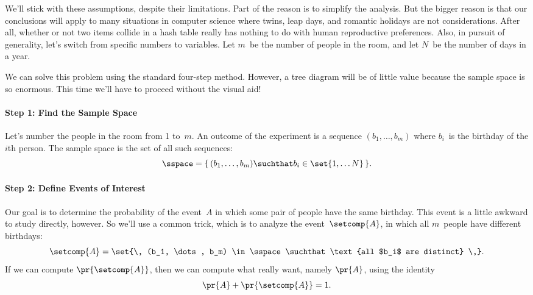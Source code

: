 \begin{editingnotes}
\begin{itemize}
\end{itemize}
We'll stick with these assumptions, despite their limitations.  Part
of the reason is to simplify the analysis.  But the bigger reason is
that our conclusions will apply to many situations in computer science
where twins, leap days, and romantic holidays are not considerations.
After all, whether or not two items collide in a hash table really has
nothing to do with human reproductive preferences.  Also, in pursuit
of generality, let's switch from specific numbers to variables.  Let
$m$~be the number of people in the room, and let $N$~be the number of
days in a year.

We can solve this problem using the standard four-step method.
However, a tree diagram will be of little value because the sample
space is so enormous.  This time we'll have to proceed without the
visual aid!

\paragraph{Step 1: Find the Sample Space}

Let's number the people in the room from 1 to~$m$.  An outcome of the
experiment is a sequence $(b_1, \dots, b_m)$ where $b_i$~is the
birthday of the $i$th person.  The sample space is the set of all such
sequences:
\begin{equation*}
    \sspace = \{\, (b_1, \dots, b_m) \suchthat b_i \in \set{1, \dots
      N} \,\}.
\end{equation*}

\paragraph{Step 2: Define Events of Interest}

Our goal is to determine the probability of the event~$A$ in which
some pair of people have the same birthday.  This event is a little
awkward to study directly, however.  So we'll use a common trick,
which is to analyze the  event~$\setcomp{A}$, in
which all $m$~people have different birthdays:
\begin{equation*}
    \setcomp{A} = \set{\, (b_1, \dots, b_m) \in \sspace
                    \suchthat \text{all $b_i$ are distinct} \,}.
\end{equation*}
If we can compute $\pr{\setcomp{A}}$, then we can compute what
really want, namely $\pr{A}$, using the identity
\begin{equation*}
    \pr{A} + \pr{\setcomp{A}} = 1.
\end{equation*}


\end{editingnotes}
